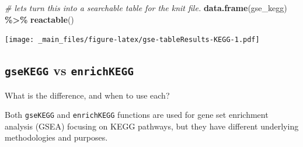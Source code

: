 \documentclass[
]{book}
\newenvironment{Shaded}{\begin{snugshade}}{\end{snugshade}}
\newcommand{\CommentTok}[1]{\textcolor[rgb]{0.56,0.35,0.01}{\textit{#1}}}
\newcommand{\FunctionTok}[1]{\textcolor[rgb]{0.13,0.29,0.53}{\textbf{#1}}}
\newcommand{\NormalTok}[1]{#1}
\newcommand{\OtherTok}[1]{\textcolor[rgb]{0.56,0.35,0.01}{#1}}
\newcommand{\SpecialCharTok}[1]{\textcolor[rgb]{0.81,0.36,0.00}{\textbf{#1}}}
\newcommand{\StringTok}[1]{\textcolor[rgb]{0.31,0.60,0.02}{#1}}
\begin{document}
\begin{Shaded}
\begin{Highlighting}[]
\CommentTok{\# let\textquotesingle{}s turn this into a searchable table for the knit file.}
\FunctionTok{data.frame}\NormalTok{(gse\_kegg) }\SpecialCharTok{\%\textgreater{}\%} \FunctionTok{reactable}\NormalTok{()}
\end{Highlighting}
\end{Shaded}

\texttt{[image: \_main\_files/figure-latex/gse-tableResults-KEGG-1.pdf]}

\begin{Shaded}
\end{Shaded}

\hypertarget{gsekegg-vs-enrichkegg}{%
\subsection{\texorpdfstring{\texttt{gseKEGG} vs \texttt{enrichKEGG}}{gseKEGG vs enrichKEGG}}\label{gsekegg-vs-enrichkegg}}

What is the difference, and when to use each?

Both \texttt{gseKEGG} and \texttt{enrichKEGG} functions are used for gene set enrichment analysis (GSEA) focusing on KEGG pathways, but they have different underlying methodologies and purposes.
\end{document}
